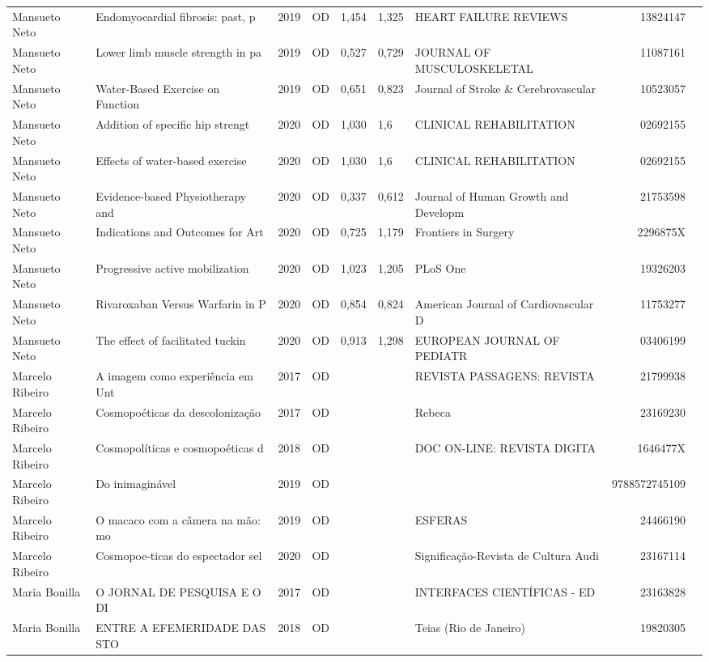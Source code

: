 \documentclass[12pt,brazil]{article}\usepackage[]{graphicx}\usepackage[]{xcolor}
\begin{document}
\begin{longtable}{lllrrllrr}
Mansueto Neto & Endomyocardial fibrosis: past, p & 2019 & OD & 1,454 & 1,325 & HEART FAILURE REVIEWS & 13824147 \\
Mansueto Neto & Lower limb muscle strength in pa & 2019 & OD & 0,527 & 0,729 & JOURNAL OF MUSCULOSKELETAL  & 11087161 \\
Mansueto Neto & Water-Based Exercise on Function & 2019 & OD & 0,651 & 0,823 & Journal of Stroke \& Cerebrovascular & 10523057 \\
Mansueto Neto & Addition of specific hip strengt & 2020 & OD & 1,030 & 1,6 & CLINICAL REHABILITATION & 02692155 \\
Mansueto Neto & Effects of water-based exercise  & 2020 & OD & 1,030 & 1,6 & CLINICAL REHABILITATION & 02692155 \\
Mansueto Neto & Evidence-based Physiotherapy and & 2020 & OD & 0,337 & 0,612 & Journal of Human Growth and Developm & 21753598 \\
Mansueto Neto & Indications and Outcomes for Art & 2020 & OD & 0,725 & 1,179 & Frontiers in Surgery & 2296875X \\
Mansueto Neto & Progressive active mobilization  & 2020 & OD & 1,023 & 1,205 & PLoS One & 19326203 \\
Mansueto Neto & Rivaroxaban Versus Warfarin in P & 2020 & OD & 0,854 & 0,824 & American Journal of Cardiovascular D & 11753277 \\
Mansueto Neto & The effect of facilitated tuckin & 2020 & OD & 0,913 & 1,298 & EUROPEAN JOURNAL OF PEDIATR & 03406199 \\
Marcelo Ribeiro & A imagem como experiência em Unt & 2017 & OD &  &  & REVISTA PASSAGENS: REVISTA  & 21799938 \\
Marcelo Ribeiro & Cosmopoéticas da descolonização  & 2017 & OD &  &  & Rebeca & 23169230 \\
Marcelo Ribeiro & Cosmopolíticas e cosmopoéticas d & 2018 & OD &  &  & DOC ON-LINE: REVISTA DIGITA & 1646477X \\
Marcelo Ribeiro & Do inimaginável & 2019 & OD &  &  &  & 9788572745109 \\
Marcelo Ribeiro & O macaco com a câmera na mão: mo & 2019 & OD &  &  & ESFERAS & 24466190 \\
Marcelo Ribeiro & Cosmopoe-ticas do espectador sel & 2020 & OD &  &  & Significação-Revista de Cultura Audi & 23167114 \\
Maria Bonilla & O JORNAL DE PESQUISA E O DI & 2017 & OD &  &  & INTERFACES CIENTÍFICAS - ED & 23163828 \\
Maria Bonilla & ENTRE A EFEMERIDADE DAS STO & 2018 & OD &  &  & Teias (Rio de Janeiro) & 19820305 \\

\end{longtable}
\end{document}
